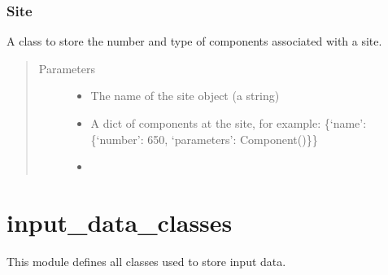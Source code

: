 \documentclass[letterpaper,10pt,english]{sphinxmanual}
\begin{document}
\subsubsection{Site}
\label{\detokenize{index:site}}

\begin{fulllineitems}
\label{\detokenize{index:feast.EmissionSimModules.infrastructure_classes.Site}}
A class to store the number and type of components associated with a site.
\begin{quote}\begin{description}
\item[{Parameters}] \leavevmode\begin{itemize}
\item {} 
 \textendash{} The name of the site object (a string)

\item {} 
 \textendash{} A dict of components at the site, for example:
\{‘name’: \{‘number’: 650, ‘parameters’: Component()\}\}

\item {} 
 \textendash{} 

\end{itemize}

\end{description}\end{quote}

\end{fulllineitems}



\section{input\_data\_classes}
\label{\detokenize{index:module-feast.input_data_classes}}\label{\detokenize{index:input-data-classes}}
This module defines all classes used to store input data.
\end{document}
